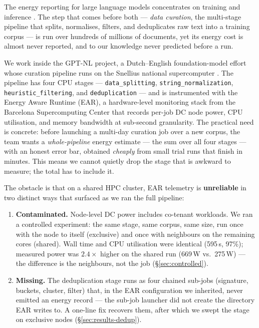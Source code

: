 \documentclass{article}
\begin{document}
The energy reporting for large language models concentrates on training and inference \cite{strubell2019energy,patterson2021carbon}. The step that comes before both --- \emph{data curation}, the multi-stage pipeline that splits, normalises, filters, and deduplicates raw text into a training corpus --- is run over hundreds of millions of documents, yet its energy cost is almost never reported, and to our knowledge never predicted before a run.

We work inside the GPT-NL project, a Dutch--English foundation-model effort whose curation pipeline runs on the Snellius national supercomputer \cite{surf_snellius}. The pipeline has four CPU stages --- \texttt{data\_splitting}, \texttt{string\_normalization}, \texttt{heuristic\_filtering}, and \texttt{deduplication} --- and is instrumented with the Energy Aware Runtime (EAR), a hardware-level monitoring stack from the Barcelona Supercomputing Center \cite{bsc_ear} that records per-job DC node power, CPU utilisation, and memory bandwidth at sub-second granularity. The practical need is concrete: before launching a multi-day curation job over a new corpus, the team wants a \emph{whole-pipeline} energy estimate --- the sum over all four stages --- with an honest error bar, obtained \emph{cheaply} from small trial runs that finish in minutes. This means we cannot quietly drop the stage that is awkward to measure; the total has to include it.

The obstacle is that on a shared HPC cluster, EAR telemetry is \textbf{unreliable} in two distinct ways that surfaced as we ran the full pipeline:

\begin{enumerate}
  \item \textbf{Contaminated.} Node-level DC power includes co-tenant workloads. We ran a controlled experiment: the same stage, same corpus, same size, run once with the node to itself (exclusive) and once with neighbours on the remaining cores (shared). Wall time and CPU utilisation were identical (595\,s, 97\%); measured power was $2.4\times$ higher on the shared run (669\,W vs.\ 275\,W) --- the difference is the neighbours, not the job (\S\ref{sec:controlled}).
  \item \textbf{Missing.} The deduplication stage runs as four chained sub-jobs (signature, buckets, cluster, filter) that, in the EAR configuration we inherited, never emitted an energy record --- the sub-job launcher did not create the directory EAR writes to. A one-line fix recovers them, after which we swept the stage on exclusive nodes (\S\ref{sec:results-dedup}).
\end{enumerate}
\end{document}
